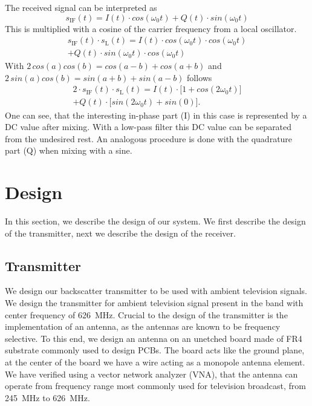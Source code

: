 \documentclass[conference]{IEEEtran}
\begin{document}
The received signal can be interpreted as
\begin{equation}
	s_{\text{IF}}(t)=I(t) \cdot cos(\omega_{0}t) + Q(t) \cdot sin(\omega_{0}t)
\end{equation}     
This is multiplied with a cosine of the carrier frequency from a local oscillator.
\begin{multline}
        s_{\text{IF}}(t) \cdot s_{\text{L}}(t) = I(t) \cdot cos(\omega_{0}t) \cdot cos(\omega_{0}t)\\+ Q(t) \cdot sin(\omega_{0}t) \cdot cos(\omega_{0}t)
\end{multline}
With \ensuremath{2\,cos(a)cos(b)=cos(a-b)+cos(a+b)} and \ensuremath{2\,sin(a)cos(b)=sin(a+b)+sin(a-b)} follows
\begin{multline}
        2 \cdot s_{\text{IF}}(t) \cdot s_{\text{L}}(t) = I(t) \cdot \bigl[1+cos(2\omega_{0}t)\bigr]\\+ Q(t) \cdot \bigl[sin(2\omega_0t)+sin(0)\bigr].
\end{multline}
One can see, that the interesting in-phase part (I) in this case is
represented by a DC value after mixing. With a low-pass filter this DC
value can be separated from the undesired rest. An analogous procedure
is done with the quadrature part (Q) when mixing with a sine.

\section{Design}
In this section, we describe the design 
of our system. We first describe the
design of the transmitter, next we describe 
the design of the receiver.

\subsection{Transmitter}
 
We design our backscatter transmitter to be used with ambient
television signals.  We design the transmitter for ambient
television signal present in the band with  
center frequency of \SI{626}{\mega\hertz}. Crucial to the design
of the transmitter is the implementation of an antenna, as
the antennas are known to be  frequency selective. To this end, we design an
antenna on an unetched board made of FR4 substrate commonly
used to design PCBs. The board acts like the ground plane, at the center
of the board we have a wire acting as a monopole antenna element. 
We have verified using a vector network analyzer (VNA), that the antenna
can operate from frequency range most commonly
used for television broadcast, 
from \SI{245}{\mega\hertz} to \SI{626}{\mega\hertz}.
\end{document}
